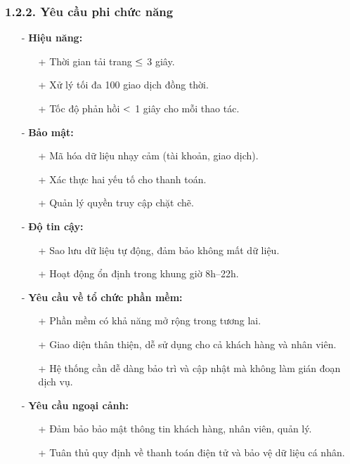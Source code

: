 \documentclass[a4paper]{article}
\begin{document}
\subsubsection{1.2.2. Yêu cầu phi chức năng}
\begin{itemize}
    \item[-] \textbf{Hiệu năng:}
    \begin{itemize}
        \item[+] Thời gian tải trang $\textcolor{black}{\leq}$ 3 giây.
        \item[+] Xử lý tối đa 100 giao dịch đồng thời.
        \item[+] Tốc độ phản hồi $\textcolor{black}{<}$ 1 giây cho mỗi thao tác.
    \end{itemize}
    \item[-] \textbf{Bảo mật:}
    \begin{itemize}
        \item[+] Mã hóa dữ liệu nhạy cảm (tài khoản, giao dịch).
        \item[+] Xác thực hai yếu tố cho thanh toán.
        \item[+] Quản lý quyền truy cập chặt chẽ.
    \end{itemize}
    \item[-] \textbf{Độ tin cậy:}
    \begin{itemize}
        \item[+] Sao lưu dữ liệu tự động, đảm bảo không mất dữ liệu.
        \item[+] Hoạt động ổn định trong khung giờ 8h–22h.
    \end{itemize}
    \item[-] \textbf{Yêu cầu về tổ chức phần mềm:}
    \begin{itemize}
        \item[+] Phần mềm có khả năng mở rộng trong tương lai.
        \item[+] Giao diện thân thiện, dễ sử dụng cho cả khách hàng và nhân viên.
        \item[+] Hệ thống cần dễ dàng bảo trì và cập nhật mà không làm gián đoạn dịch vụ.
    \end{itemize}
    \item[-] \textbf{Yêu cầu ngoại cảnh:}
    \begin{itemize}
        \item[+] Đảm bảo bảo mật thông tin khách hàng, nhân viên, quản lý.
        \item[+] Tuân thủ quy định về thanh toán điện tử và bảo vệ dữ liệu cá nhân.
    \end{itemize}
\end{itemize}
\end{document}
